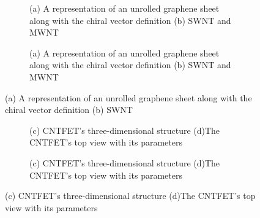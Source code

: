 
\begin{figure}[htbp]
  \centering
  \begin{subfigure}[b]{0.48\linewidth}
    \centering
    \caption{(a) A representation of an unrolled graphene sheet along with the chiral vector definition (b) SWNT and MWNT}

  \end{subfigure}
  \hfill
  \begin{subfigure}[b]{0.48\linewidth}
    \centering
    \caption{(a) A representation of an unrolled graphene sheet along with the chiral vector definition (b) SWNT and MWNT}

  \end{subfigure}
  \caption{(a) A representation of an unrolled graphene sheet along with the chiral vector definition (b) SWNT}

  \label{fig:group_tfvnf}
\end{figure}

\begin{figure}[htbp]
  \centering
  \begin{subfigure}[b]{0.48\linewidth}
    \centering
    \caption{(c) CNTFET's three-dimensional structure (d)The CNTFET's top view with its parameters}

  \end{subfigure}
  \hfill
  \begin{subfigure}[b]{0.48\linewidth}
    \centering
    \caption{(c) CNTFET's three-dimensional structure (d)The CNTFET's top view with its parameters}

  \end{subfigure}
  \caption{(c) CNTFET's three-dimensional structure (d)The CNTFET's top view with its parameters}

  \label{fig:group_yk4t5}
\end{figure}

